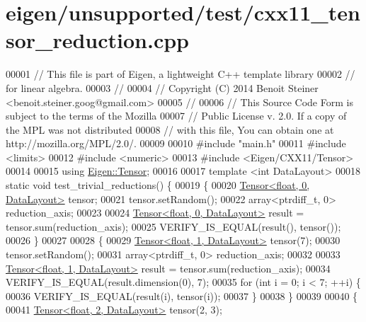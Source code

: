 \hypertarget{eigen_2unsupported_2test_2cxx11__tensor__reduction_8cpp_source}{}\section{eigen/unsupported/test/cxx11\+\_\+tensor\+\_\+reduction.cpp}
\label{eigen_2unsupported_2test_2cxx11__tensor__reduction_8cpp_source}

\begin{DoxyCode}
00001 \textcolor{comment}{// This file is part of Eigen, a lightweight C++ template library}
00002 \textcolor{comment}{// for linear algebra.}
00003 \textcolor{comment}{//}
00004 \textcolor{comment}{// Copyright (C) 2014 Benoit Steiner <benoit.steiner.goog@gmail.com>}
00005 \textcolor{comment}{//}
00006 \textcolor{comment}{// This Source Code Form is subject to the terms of the Mozilla}
00007 \textcolor{comment}{// Public License v. 2.0. If a copy of the MPL was not distributed}
00008 \textcolor{comment}{// with this file, You can obtain one at http://mozilla.org/MPL/2.0/.}
00009 
00010 \textcolor{preprocessor}{#include "main.h"}
00011 \textcolor{preprocessor}{#include <limits>}
00012 \textcolor{preprocessor}{#include <numeric>}
00013 \textcolor{preprocessor}{#include <Eigen/CXX11/Tensor>}
00014 
00015 \textcolor{keyword}{using} \hyperlink{class_eigen_1_1_tensor}{Eigen::Tensor};
00016 
00017 \textcolor{keyword}{template} <\textcolor{keywordtype}{int} DataLayout>
00018 \textcolor{keyword}{static} \textcolor{keywordtype}{void} test\_trivial\_reductions() \{
00019   \{
00020     \hyperlink{class_eigen_1_1_tensor}{Tensor<float, 0, DataLayout>} tensor;
00021     tensor.setRandom();
00022     array<ptrdiff\_t, 0> reduction\_axis;
00023 
00024     \hyperlink{class_eigen_1_1_tensor}{Tensor<float, 0, DataLayout>} result = tensor.sum(reduction\_axis);
00025     VERIFY\_IS\_EQUAL(result(), tensor());
00026   \}
00027 
00028   \{
00029     \hyperlink{class_eigen_1_1_tensor}{Tensor<float, 1, DataLayout>} tensor(7);
00030     tensor.setRandom();
00031     array<ptrdiff\_t, 0> reduction\_axis;
00032 
00033     \hyperlink{class_eigen_1_1_tensor}{Tensor<float, 1, DataLayout>} result = tensor.sum(reduction\_axis);
00034     VERIFY\_IS\_EQUAL(result.dimension(0), 7);
00035     \textcolor{keywordflow}{for} (\textcolor{keywordtype}{int} i = 0; i < 7; ++i) \{
00036       VERIFY\_IS\_EQUAL(result(i), tensor(i));
00037     \}
00038   \}
00039 
00040   \{
00041     \hyperlink{class_eigen_1_1_tensor}{Tensor<float, 2, DataLayout>} tensor(2, 3);

\end{DoxyCode}
